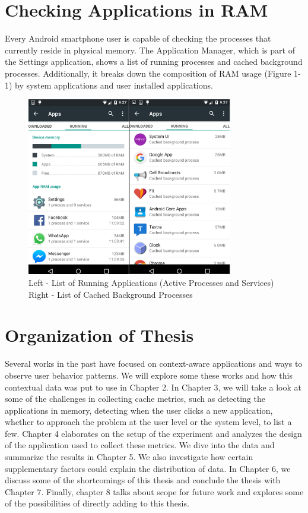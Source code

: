 \documentclass[12pt]{uthesis-v12}  %
\begin{document}
	\section{Checking Applications in RAM}
		Every Android smartphone user is capable of checking the processes that currently reside in physical memory. The Application Manager, which is part of the Settings application, shows a list of running processes and cached background processes. Additionally, it breaks down the composition of RAM usage (Figure 1-1) by system applications and user installed applications. 
		
		\begin{figure}[h]
			\centering
			\includegraphics[width = 90mm]{images/runningApps.png}
			\caption[Running Applications and Cached Background Processes]
			{Left - List of Running Applications (Active Processes and Services)\\
				Right - List of Cached Background Processes}
		\end{figure}	

	\section{Organization of Thesis}
		Several works in the past have focused on context-aware applications and ways to observe user behavior patterns. We will explore some these works and how this contextual data was put to use in Chapter 2. In Chapter 3, we will take a look at some of the challenges in collecting cache metrics, such as detecting the applications in memory, detecting when the user clicks a new application, whether to approach the problem at the user level or the system level, to list a few. Chapter 4 elaborates on the setup of the experiment and analyzes the design of the application used to collect these metrics. We dive into the data and summarize the results in Chapter 5. We also investigate how certain supplementary factors could explain the distribution of data. In Chapter 6, we discuss some of the shortcomings of this thesis and conclude the thesis with Chapter 7. Finally, chapter 8 talks about scope for future work and explores some of the possibilities of directly adding to this thesis.  
\end{document}
